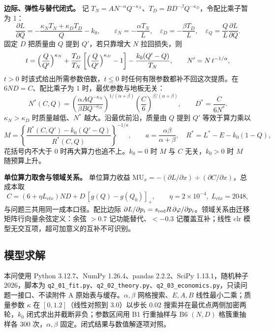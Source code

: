 \textbf{边际、弹性与替代闭式。} 记 $T_N=AN^{-\alpha}Q^{-\kappa_N}$、$T_D=BD^{-\beta}Q^{-\kappa_D}$，令配比乘子暂为 1：
\begin{equation*}
\frac{\partial L}{\partial Q}=-\frac{\kappa_NT_N+\kappa_DT_D}{Q}-k_0,\qquad
\varepsilon_N=-\frac{\alpha T_N}{L},\quad \varepsilon_D=-\frac{\beta T_D}{L},\quad \varepsilon_Q=\frac{Q}{L}\frac{\partial L}{\partial Q}.
\end{equation*}
固定 $D$ 把质量由 $Q$ 提到 $Q'$，若只靠增大 $N$ 拉回损失，则
\begin{equation*}
t=\Bigl(\frac{Q}{Q'}\Bigr)^{\kappa_N}+\frac{T_D}{T_N}\left[\Bigl(\frac{Q}{Q'}\Bigr)^{\kappa_D}-1\right]-\frac{k_0(Q'-Q)}{T_N},\qquad N'=N\,t^{-1/\alpha},
\end{equation*}
$t>0$ 时该式给出所需参数倍数，$t\le0$ 时任何有限参数都补不回这次提质。在 $6ND=C$、配比乘子为 1 时，最优参数与地板无关：
\begin{equation*}
N^*(C,Q)=\left(\frac{\alpha A Q^{-\kappa_N}}{\beta B Q^{-\kappa_D}}\right)^{1/(\alpha+\beta)}
\left(\frac{C}{6}\right)^{\beta/(\alpha+\beta)},\qquad D^*=\frac{C}{6N^*}.
\end{equation*}
$\kappa_N>\kappa_D$ 时质量越低、$N^*$ 越大。沿最优前沿，质量由 $Q$ 提到 $Q'$ 等效于算力乘以
\begin{equation*}
M=\left\{\frac{R^*(C,Q')-k_0(Q'-Q)}{R^*(C,Q)}\right\}^{-1/a},\qquad
a=\frac{\alpha\beta}{\alpha+\beta},\quad R^*=L^*-E-k_0(1-Q),
\end{equation*}
花括号内不大于 0 时再大算力也追不上。$k_0=0$ 时 $M$ 与 $C$ 无关，$k_0>0$ 时 $M$ 随预算上升。

\textbf{单位算力取舍与领域关系。} 单位算力收益 $\mathrm{MU}_x=-(\partial L/\partial x)\div(\partial C/\partial x)$，总成本取
\begin{equation*}
C=(6+\eta L_{ctx})ND+D\,[g(Q)-g(Q_0)]_+,\qquad \eta=2\times10^{-4},\;L_{ctx}=2048,
\end{equation*}
与问题三共用同一成本口径。配比边际 $\partial L/\partial p_i=s_{\rm red}R\,\partial\varphi/\partial p_i$。领域关系由迁移矩阵行向量余弦定义：余弦 $>0.7$ 记功能替代、$<-0.3$ 记覆盖互补；线性 clr 模型无交互项，超可加意义的互补不可识别。

\subsection{模型求解}
\label{sec:5.3.6}

本问使用 Python 3.12.7、NumPy 1.26.4、pandas 2.2.2、SciPy 1.13.1，随机种子 $2026$，脚本为 \texttt{q2\_01\_fit.py}、\texttt{q2\_02\_theory.py}、\texttt{q2\_03\_economics.py}，只读问题一接口、不读附件 A 原始表与缓存。$\alpha,\beta$ 网格搜索、$E,A,B$ 线性最小二乘；质量参数 $\kappa$ 在 $[0,1.2]$（线性对照到 $3.0$）以步长 $0.02$ 搜索并在最优点两侧加密两轮，$k_0$ 闭式求出并截断非负；参数区间用 B1 行重抽样与 B6 $(N,D)$ 格簇重抽样各 300 次，$\alpha,\beta$ 固定。闭式结果与数值解逐项对照。

